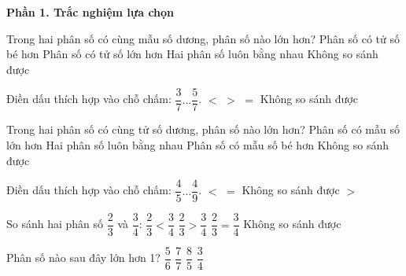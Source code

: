 \textbf{Phần 1. Trắc nghiệm lựa chọn}

\begin{ex} %
Trong hai phân số có cùng mẫu số dương, phân số nào lớn hơn?
\choice
{Phân số có tử số bé hơn}
{\True Phân số có tử số lớn hơn}
{Hai phân số luôn bằng nhau}
{Không so sánh được}
\end{ex}

\begin{ex} %
Điền dấu thích hợp vào chỗ chấm: $\dfrac{3}{7} \dots \dfrac{5}{7}$.
\choice
{\True $<$}
{$>$}
{$=$}
{Không so sánh được}
\end{ex}

\begin{ex} %
Trong hai phân số có cùng tử số dương, phân số nào lớn hơn?
\choice
{Phân số có mẫu số lớn hơn}
{Hai phân số luôn bằng nhau}
{\True Phân số có mẫu số bé hơn}
{Không so sánh được}
\end{ex}

\begin{ex} %
Điền dấu thích hợp vào chỗ chấm: $\dfrac{4}{5} \dots \dfrac{4}{9}$.
\choice
{$<$}
{$=$}
{Không so sánh được}
{\True $>$}
\end{ex}

\begin{ex} %
So sánh hai phân số $\dfrac{2}{3}$ và $\dfrac{3}{4}$:
\choice
{\True $\dfrac{2}{3} < \dfrac{3}{4}$}
{$\dfrac{2}{3} > \dfrac{3}{4}$}
{$\dfrac{2}{3} = \dfrac{3}{4}$}
{Không so sánh được}
\end{ex}

\begin{ex} %
Phân số nào sau đây lớn hơn 1?
\choice
{$\dfrac{5}{6}$}
{$\dfrac{7}{7}$}
{\True $\dfrac{8}{5}$}
{$\dfrac{3}{4}$}
\end{ex}

